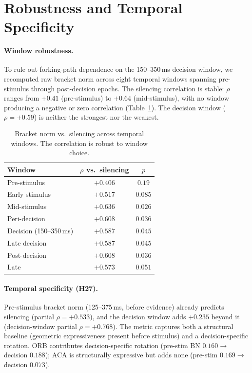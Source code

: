 \documentclass{article}
\begin{document}
\clearpage
\appendix

\section{Robustness and Temporal Specificity}
\label{app:robustness}

\paragraph{Window robustness.} To rule out forking-path dependence on the 150--350\,ms decision window, we recomputed raw bracket norm across eight temporal windows spanning pre-stimulus through post-decision epochs. The silencing correlation is stable: $\rho$ ranges from $+0.41$ (pre-stimulus) to $+0.64$ (mid-stimulus), with no window producing a negative or zero correlation (Table~\ref{tab:windows}). The decision window ($\rho = +0.59$) is neither the strongest nor the weakest.

\begin{table}[h]
\centering
\caption{Bracket norm vs.\ silencing across temporal windows. The correlation is robust to window choice.}
\label{tab:windows}
\small
\begin{tabular}{lcc}
\toprule
Window & $\rho$ vs.\ silencing & $p$ \\
\midrule
Pre-stimulus & $+0.406$ & $0.19$ \\
Early stimulus & $+0.517$ & $0.085$ \\
Mid-stimulus & $+0.636$ & $0.026$ \\
Peri-decision & $+0.608$ & $0.036$ \\
Decision (150--350\,ms) & $+0.587$ & $0.045$ \\
Late decision & $+0.587$ & $0.045$ \\
Post-decision & $+0.608$ & $0.036$ \\
Late & $+0.573$ & $0.051$ \\
\bottomrule
\end{tabular}
\end{table}

\paragraph{Temporal specificity (H27).} Pre-stimulus bracket norm (125--375\,ms, before evidence) already predicts silencing (partial $\rho = +0.533$), and the decision window adds $+0.235$ beyond it (decision-window partial $\rho = +0.768$). The metric captures both a structural baseline (geometric expressiveness present before stimulus) and a decision-specific rotation. ORB contributes decision-specific rotation (pre-stim BN $0.160 \to$ decision $0.188$); ACA is structurally expressive but adds none (pre-stim $0.169 \to$ decision $0.073$).
\end{document}
